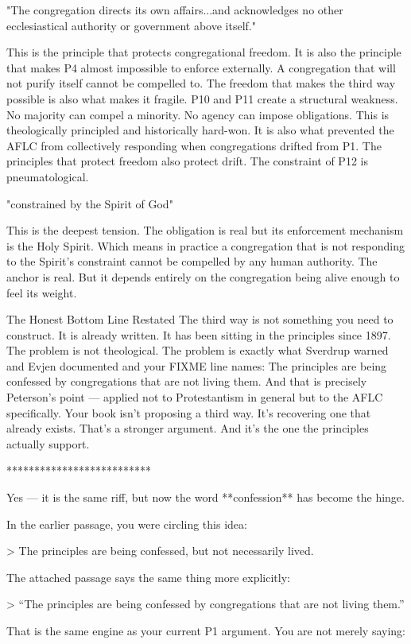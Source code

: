 "The congregation directs its own affairs...and acknowledges no other ecclesiastical authority or government above itself."

This is the principle that protects congregational freedom. It is also the principle that makes P4 almost impossible to enforce externally. A congregation that will not purify itself cannot be compelled to. The freedom that makes the third way possible is also what makes it fragile.
P10 and P11 create a structural weakness.
No majority can compel a minority. No agency can impose obligations. This is theologically principled and historically hard-won. It is also what prevented the AFLC from collectively responding when congregations drifted from P1. The principles that protect freedom also protect drift.
The constraint of P12 is pneumatological.

"constrained by the Spirit of God"

This is the deepest tension. The obligation is real but its enforcement mechanism is the Holy Spirit. Which means in practice a congregation that is not responding to the Spirit's constraint cannot be compelled by any human authority. The anchor is real. But it depends entirely on the congregation being alive enough to feel its weight.

The Honest Bottom Line Restated
The third way is not something you need to construct. It is already written. It has been sitting in the principles since 1897.
The problem is not theological. The problem is exactly what Sverdrup warned and Evjen documented and your FIXME line names:
The principles are being confessed by congregations that are not living them.
And that is precisely Peterson's point — applied not to Protestantism in general but to the AFLC specifically.
Your book isn't proposing a third way. It's recovering one that already exists. That's a stronger argument. And it's the one the principles actually support.


**************************

Yes — it is the same riff, but now the word **confession** has become the hinge.

In the earlier passage, you were circling this idea:

> The principles are being confessed, but not necessarily lived.

The attached passage says the same thing more explicitly:

> “The principles are being confessed by congregations that are not living them.” 

That is the same engine as your current P1 argument. You are not merely saying:

